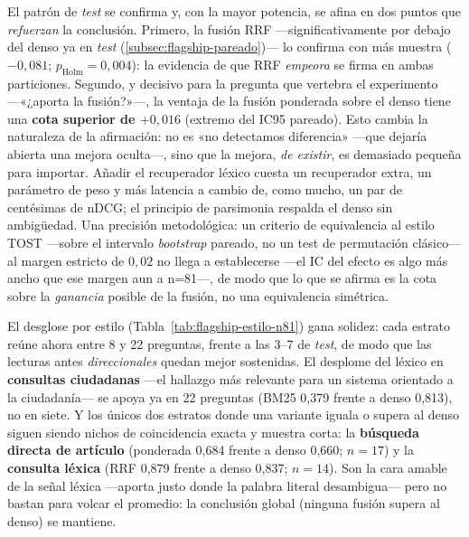 El patrón de \emph{test} se confirma y, con la mayor potencia, se afina en dos puntos que \emph{refuerzan} la conclusión. Primero, la fusión RRF —significativamente por debajo del denso ya en \emph{test} (\ref{subsec:flagship-pareado})— lo confirma con más muestra ($-0{,}081$; $p_{\text{Holm}}{=}0{,}004$): la evidencia de que RRF \emph{empeora} se firma en ambas particiones. Segundo, y decisivo para la pregunta que vertebra el experimento —«¿aporta la fusión?»—, la ventaja de la fusión ponderada sobre el denso tiene una \textbf{cota superior de $+0{,}016$} (extremo del IC95 pareado). Esto cambia la naturaleza de la afirmación: no es «no detectamos diferencia» —que dejaría abierta una mejora oculta—, sino que la mejora, \emph{de existir}, es demasiado pequeña para importar. Añadir el recuperador léxico cuesta un recuperador extra, un parámetro de peso y más latencia a cambio de, como mucho, un par de centésimas de nDCG; el principio de parsimonia respalda el denso sin ambigüedad. Una precisión metodológica: un criterio de equivalencia al estilo TOST —sobre el intervalo \emph{bootstrap} pareado, no un test de permutación clásico— al margen estricto de $0{,}02$ no llega a establecerse —el IC del efecto es algo más ancho que ese margen aun a n=81—, de modo que lo que se afirma es la cota sobre la \emph{ganancia} posible de la fusión, no una equivalencia simétrica.

El desglose por estilo (Tabla~\ref{tab:flagship-estilo-n81}) gana solidez: cada estrato reúne ahora entre 8 y 22 preguntas, frente a las 3--7 de \emph{test}, de modo que las lecturas antes \emph{direccionales} quedan mejor sostenidas. El desplome del léxico en \textbf{consultas ciudadanas} —el hallazgo más relevante para un sistema orientado a la ciudadanía— se apoya ya en 22 preguntas (BM25 0,379 frente a denso 0,813), no en siete. Y los únicos dos estratos donde una variante iguala o supera al denso siguen siendo nichos de coincidencia exacta y muestra corta: la \textbf{búsqueda directa de artículo} (ponderada 0,684 frente a denso 0,660; $n=17$) y la \textbf{consulta léxica} (RRF 0,879 frente a denso 0,837; $n=14$). Son la cara amable de la señal léxica —aporta justo donde la palabra literal desambigua— pero no bastan para volcar el promedio: la conclusión global (ninguna fusión supera al denso) se mantiene.


